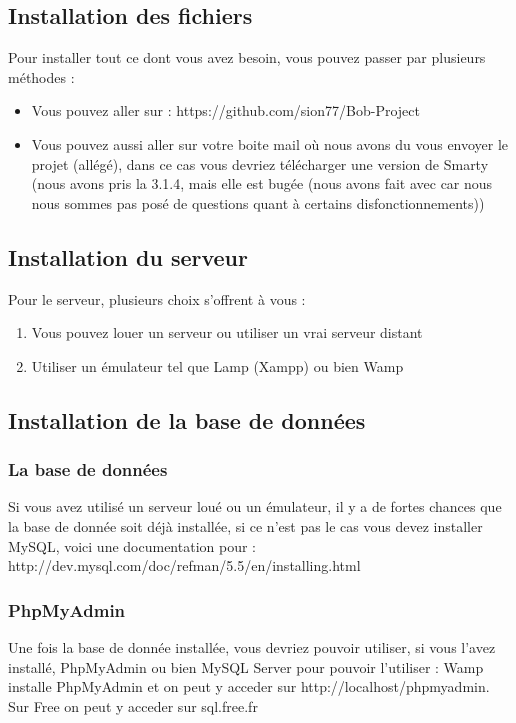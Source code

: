 
\subsection{Installation des fichiers}
	Pour installer tout ce dont vous avez besoin, vous pouvez passer par plusieurs méthodes :

\begin{itemize}
	\item Vous pouvez aller sur : https://github.com/sion77/Bob-Project
	\item Vous pouvez aussi aller sur votre boite mail où nous avons du vous envoyer le projet (allégé), dans ce cas vous devriez télécharger une version de Smarty (nous avons pris la 3.1.4, mais elle est bugée (nous avons fait avec car nous nous sommes pas posé de questions quant à certains disfonctionnements))
\end{itemize}

\subsection{Installation du serveur}
	Pour le serveur, plusieurs choix s'offrent à vous :
	\begin{enumerate}
		\item Vous pouvez louer un serveur ou utiliser un vrai serveur distant
		\item Utiliser un émulateur tel que Lamp (Xampp) ou bien Wamp
	\end{enumerate}

\subsection{Installation de la base de données}

	\subsubsection{La base de données}
	
	Si vous avez utilisé un serveur loué ou un émulateur, il y a de fortes chances que la base de donnée soit déjà installée, si ce n'est pas le cas
vous devez installer MySQL, voici une documentation pour :\\
http://dev.mysql.com/doc/refman/5.5/en/installing.html\\

	\subsubsection{PhpMyAdmin}
	Une fois la base de donnée installée, vous devriez pouvoir utiliser, si vous l'avez installé, PhpMyAdmin ou bien MySQL Server pour pouvoir l'utiliser : Wamp installe PhpMyAdmin et on peut y acceder sur http://localhost/phpmyadmin.\\
	Sur Free on peut y acceder sur sql.free.fr
	

